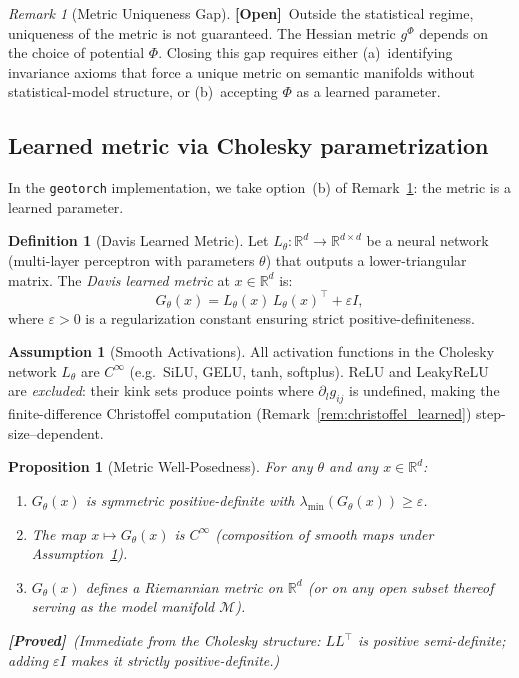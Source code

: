 \documentclass[11pt,a4paper]{article}
\newtheorem{proposition}[theorem]{Proposition}
\theoremstyle{definition}
\newtheorem{definition}[theorem]{Definition}
\newtheorem{assumption}[theorem]{Assumption}
\theoremstyle{remark}
\newtheorem{remark}[theorem]{Remark}
\newcommand{\R}{\mathbb{R}}
\newcommand{\statusproved}{\textcolor{green!50!black}{\textbf{[Proved]}}}
\newcommand{\statusopen}{\textcolor{red!70!black}{\textbf{[Open]}}}
\begin{document}
\begin{remark}[Metric Uniqueness Gap]\label{rem:metric_gap}
\statusopen\ Outside the statistical regime, uniqueness of the metric 
is not guaranteed. The Hessian metric $g^\Phi$ depends on the choice 
of potential $\Phi$. Closing this gap requires either (a)~identifying 
invariance axioms that force a unique metric on semantic manifolds 
without statistical-model structure, or (b)~accepting $\Phi$ as a 
learned parameter.
\end{remark}

\subsection{Learned metric via Cholesky parametrization}%
\label{sec:learned_metric}

In the \texttt{geotorch} implementation, we take option~(b) of 
Remark~\ref{rem:metric_gap}: the metric is a learned parameter.

\begin{definition}[Davis Learned Metric]\label{def:learned_metric}
Let $L_\theta : \R^d \to \R^{d \times d}$ be a neural network 
(multi-layer perceptron with parameters $\theta$) that outputs a 
lower-triangular matrix. The \emph{Davis learned metric} at 
$x \in \R^d$ is:
\begin{equation}\label{eq:learned_metric}
    G_\theta(x) = L_\theta(x)\, L_\theta(x)^\top + \varepsilon I,
\end{equation}
where $\varepsilon > 0$ is a regularization constant ensuring 
strict positive-definiteness.
\end{definition}

\begin{assumption}[Smooth Activations]\label{ass:smooth_act}
All activation functions in the Cholesky network $L_\theta$ are 
$C^\infty$ (e.g.\ SiLU, GELU, tanh, softplus). ReLU and 
LeakyReLU are \emph{excluded}: their kink sets produce points 
where $\partial_l g_{ij}$ is undefined, making the 
finite-difference Christoffel computation 
(Remark~\ref{rem:christoffel_learned}) step-size--dependent.
\end{assumption}

\begin{proposition}[Metric Well-Posedness]\label{prop:metric_wellposed}
For any $\theta$ and any $x \in \R^d$:
\begin{enumerate}[nosep,label=(\roman*)]
  \item $G_\theta(x)$ is symmetric positive-definite with 
  $\lambda_{\min}(G_\theta(x)) \geq \varepsilon$.
  \item The map $x \mapsto G_\theta(x)$ is $C^\infty$ 
  (composition of smooth maps under 
  Assumption~\ref{ass:smooth_act}).
  \item $G_\theta(x)$ defines a Riemannian metric on $\R^d$ 
  (or on any open subset thereof serving as the model manifold 
  $\mathcal{M}$).
\end{enumerate}
\statusproved\ (Immediate from the Cholesky structure: 
$L L^\top$ is positive semi-definite; adding $\varepsilon I$ 
makes it strictly positive-definite.)
\end{proposition}
\end{document}
